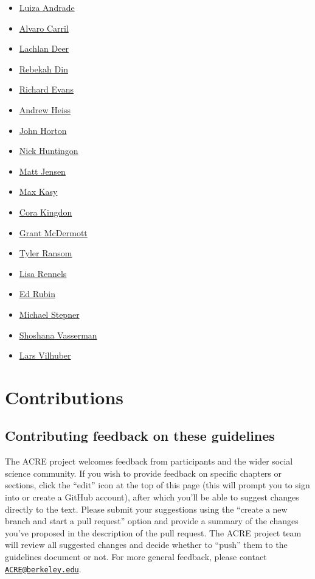 \documentclass[]{book}
\providecommand{\tightlist}{%
  \setlength{\itemsep}{0pt}\setlength{\parskip}{0pt}}
\begin{document}
\begin{itemize}
\tightlist
\item
  \href{https://github.com/luizaandrade}{Luiza Andrade}
\item
  \href{https://github.com/acarril}{Alvaro Carril}
\item
  \href{https://github.com/lachlandeer}{Lachlan Deer}
\item
  \href{https://github.com/rebekahanne}{Rebekah Din}
\item
  \href{https://github.com/rickecon}{Richard Evans}
\item
  \href{https://github.com/andrewheiss}{Andrew Heiss}
\item
  \href{https://github.com/johnjosephhorton}{John Horton}
\item
  \href{https://github.com/NickCH-K}{Nick Huntingon}
\item
  \href{https://github.com/MattHJensen}{Matt Jensen}
\item
  \href{https://github.com/maxkasy}{Max Kasy}
\item
  \href{https://github.com/ckingdon95}{Cora Kingdon}
\item
  \href{https://github.com/grantmcdermott}{Grant McDermott}
\item
  \href{https://github.com/tyleransom}{Tyler Ransom}
\item
  \href{https://github.com/lrennels}{Lisa Rennels}
\item
  \href{https://github.com/edrubin}{Ed Rubin}
\item
  \href{https://github.com/michaelstepner}{Michael Stepner}
\item
  \href{https://github.com/shoshievass}{Shoshana Vasserman}\\
\item
  \href{https://github.com/larsvilhuber}{Lars Vilhuber}
\end{itemize}

\hypertarget{contributions}{%
\chapter{Contributions}\label{contributions}}

\hypertarget{contrib-guide}{%
\section{Contributing feedback on these guidelines}\label{contrib-guide}}

The ACRE project welcomes feedback from participants and the wider social science community. If you wish to provide feedback on specific chapters or sections, click the ``edit'' icon at the top of this page (this will prompt you to sign into or create a GitHub account), after which you'll be able to suggest changes directly to the text. Please submit your suggestions using the ``create a new branch and start a pull request'' option and provide a summary of the changes you've proposed in the description of the pull request. The ACRE project team will review all suggested changes and decide whether to ``push'' them to the guidelines document or not. For more general feedback, please contact \href{mailto:ACRE@berkeley.edu}{\nolinkurl{ACRE@berkeley.edu}}.
\end{document}
